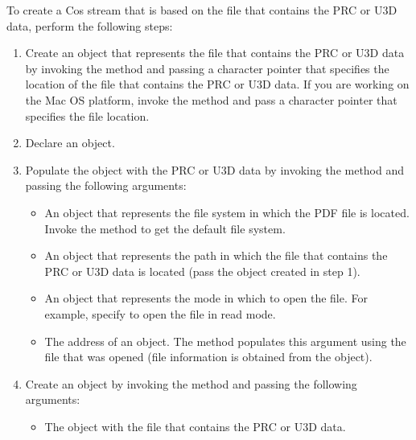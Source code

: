 \documentclass[letterpaper,12pt,english,openany,oneside]{sphinxmanual}
\begin{document}
To create a Cos stream that is based on the file that contains the PRC or U3D data, perform the following steps:
\begin{enumerate}
%
\item {} 
Create an  object that represents the file that contains the PRC or U3D data by invoking the  method and passing a character pointer that specifies the location of the file that contains the PRC or U3D data. If you are working on the Mac OS platform, invoke the  method and pass a character pointer that specifies the file location.

\item {} 
Declare an  object.

\item {} 
Populate the  object with the PRC or U3D data by invoking the  method and passing the following arguments:
\begin{itemize}
\item {} 
An  object that represents the file system in which the PDF file is located. Invoke the  method to get the default file system.

\item {} 
An  object that represents the path in which the file that contains the PRC or U3D data is located (pass the  object created in step 1).

\item {} 
An  object that represents the mode in which to open the file. For example, specify  to open the file in read mode.

\item {} 
The address of an  object. The  method populates this argument using the file that was opened (file information is obtained from the  object).

\end{itemize}

\item {} 
Create an  object by invoking the  method and passing the following arguments:
\begin{itemize}
\item {} 
The  object with the file that contains the PRC or U3D data.


\end{itemize}
\end{enumerate}
\end{document}

